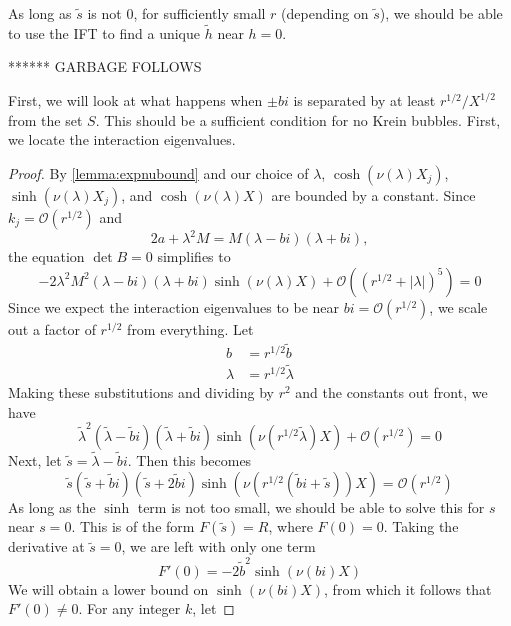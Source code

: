 \documentclass[thesis.tex]{subfiles}
\begin{document}
As long as $\tilde{s}$ is not 0, for sufficiently small $r$ (depending on $\tilde{s}$), we should be able to use the IFT to find a unique $\tilde{h}$ near $h = 0$. 



******
GARBAGE FOLLOWS

First, we will look at what happens when $\pm bi$ is separated by at least $r^{1/2}/X^{1/2}$ from the set $S$. This should be a sufficient condition for no Krein bubbles. First, we locate the interaction eigenvalues.

\begin{lemma}
\begin{proof}
By \cref{lemma:expnubound} and our choice of $\lambda$, $\cosh(\nu(\lambda)X_j)$, $\sinh(\nu(\lambda)X_j)$, and $\cosh(\nu(\lambda)X)$ are bounded by a constant. Since $k_j = \mathcal{O}(r^{1/2})$ and
\[
2a + \lambda^2 M = M( \lambda - b i) (\lambda + b i),
\]
the equation $\det B = 0$ simplifies to 
\begin{equation}\label{simpleDetB1}
-2 \lambda^2 M^2 ( \lambda - b i) (\lambda + b i)\sinh(\nu(\lambda)X) + \mathcal{O}( (r^{1/2} + |\lambda|)^5 ) = 0
\end{equation}
Since we expect the interaction eigenvalues to be near $bi = \mathcal{O}(r^{1/2})$, we scale out a factor of $r^{1/2}$ from everything. Let
\begin{align*}
b &= r^{1/2} \tilde{b} \\
\lambda &= r^{1/2} \tilde{\lambda}
\end{align*}
Making these substitutions and dividing by $r^2$ and the constants out front, we have
\begin{equation}\label{simpleDetB2}
\tilde{\lambda}^2 ( \tilde{\lambda} - \tilde{b} i) (\tilde{\lambda} + \tilde{b} i)\sinh(\nu(r^{1/2}\tilde{\lambda})X) + \mathcal{O}(r^{1/2}) = 0
\end{equation}
Next, let $\tilde{s} = \tilde{\lambda} - \tilde{b} i$. Then this becomes
\begin{equation}\label{simpleDetB3}
\tilde{s} (\tilde{s} + \tilde{b} i) (\tilde{s} + 2 \tilde{b} i)\sinh(\nu(r^{1/2}(\tilde{b}i + \tilde{s}))X) = \mathcal{O}(r^{1/2})
\end{equation}
As long as the $\sinh$ term is not too small, we should be able to solve this for $s$ near $s = 0$. This is of the form $F(\tilde{s}) = R$, where $F(0) = 0$. Taking the derivative at $\tilde{s} = 0$, we are left with only one term
\[
F'(0) = -2 \tilde{b}^2 \sinh(\nu(bi)X)
\]
We will obtain a lower bound on $\sinh(\nu(bi)X)$, from which it follows that $F'(0) \neq 0$. For any integer $k$, let

\end{proof}
\end{lemma}
\end{document}
